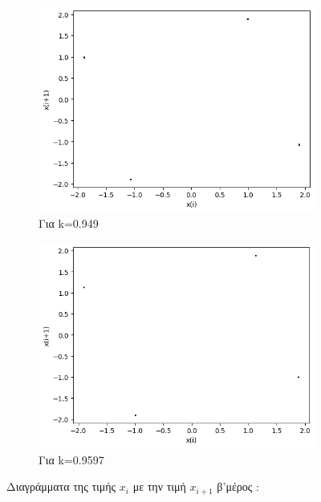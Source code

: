 \begin{figure}[h!]
\begin{subfigure}[b]{0.4\textwidth}
		\includegraphics[width=\textwidth]{LateX images/graphs q19/g13}
		\caption{Για k=0.949}
		\label{f:k102}
	\end{subfigure}
	\hfill
	\begin{subfigure}[b]{0.4\textwidth}
		\centering
		\includegraphics[width=\textwidth]{LateX images/graphs q19/g14}
		\caption{Για k=0.9597}
		\label{f:k103}
	\end{subfigure}
	\hfill
	\caption{Διαγράμματα της τιμής \(x_i\) με την τιμή \(x_{i+1}\) β'μέρος :}
	\label{f:k243}
\end{figure}